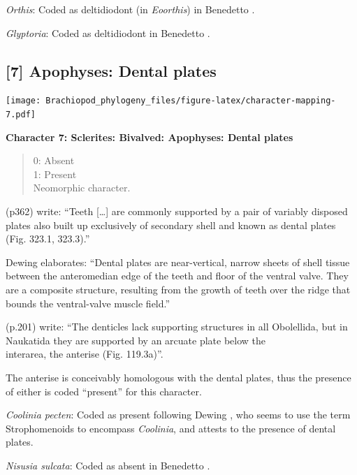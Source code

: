 \documentclass[]{book}
\theoremstyle{definition}
\theoremstyle{definition}
\theoremstyle{definition}
\theoremstyle{remark}
\begin{document}
\emph{Orthis}: Coded as deltidiodont (in \emph{Eoorthis}) in Benedetto
\citeyearpar{Benedetto2009iChaniella}.

\emph{Glyptoria}: Coded as deltidiodont in Benedetto
\citeyearpar{Benedetto2009iChaniella}.

\hypertarget{apophyses-dental-plates}{%
\subsection*{{[}7{]} Apophyses: Dental
plates}\label{apophyses-dental-plates}}

\texttt{[image: Brachiopod\_phylogeny\_files/figure-latex/character-mapping-7.pdf]}

\textbf{Character 7: Sclerites: Bivalved: Apophyses: Dental plates}

\begin{quote}
0: Absent\\
1: Present\\
Neomorphic character.
\end{quote}

\citet{Williams1997BrachiopodaRevised} (p362) write: ``Teeth
{[}\ldots{}{]} are commonly supported by a pair of variably disposed
plates also built up exclusively of secondary shell and known as dental
plates (Fig. 323.1, 323.3).''

Dewing \citeyearpar{Dewing2001Hingemodifications} elaborates: ``Dental
plates are near-vertical, narrow sheets of shell tissue between the
anteromedian edge of the teeth and floor of the ventral valve. They are
a composite structure, resulting from the growth of teeth over the ridge
that bounds the ventral-valve muscle field.''

\citet{Williams2000BrachiopodaLinguliformea} (p.201) write: ``The
denticles lack supporting structures in all Obolellida, but in Naukatida
they are supported by an arcuate plate below the\\
interarea, the anterise (Fig. 119.3a)''.

The anterise is conceivably homologous with the dental plates, thus the
presence of either is coded ``present'' for this character.

\emph{Coolinia pecten}: Coded as present following Dewing
\citeyearpar{Dewing2001Hingemodifications}, who seems to use the term
Strophomenoids to encompass \emph{Coolinia}, and attests to the presence
of dental plates.

\emph{Nisusia sulcata}: Coded as absent in Benedetto
\citeyearpar{Benedetto2009iChaniella}.
\end{document}
